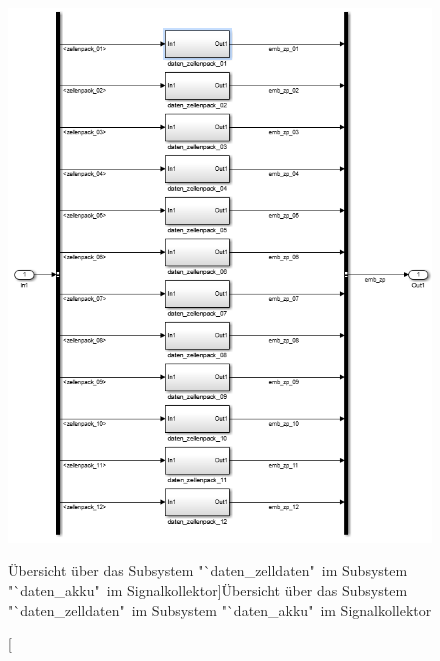 \documentclass[fontsize = 12pt, paper = a4]{scrreprt}
\begin{document}
\begin{figure}[h]
\centering
\includegraphics[scale = 0.85]{sc_daten_zelldaten}
\caption[Übersicht über das Subsystem "`daten\_zelldaten"\ im Subsystem  "`daten\_akku"\ im Signalkollektor]{Übersicht über das Subsystem "`daten\_zelldaten"\ im Subsystem  "`daten\_akku"\ im Signalkollektor}
\label{scdatenzelldaten}
\end{figure}

\newpage
\end{document}
